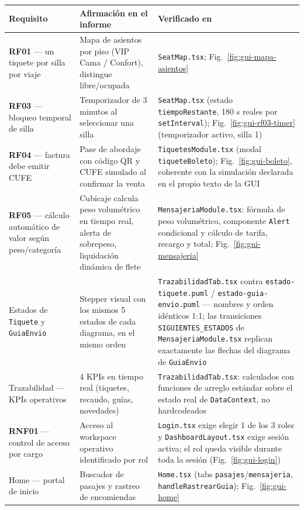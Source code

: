 \documentclass[11pt,a4paper]{article}
\begin{document}
{\small{}
\begin{longtable}{L{3.7cm} L{4.9cm} L{5.9cm}}
\toprule
{}\textbf{Requisito} & \textbf{Afirmación en el informe} & \textbf{Verificado en} \\
\midrule
\endhead
\textbf{RF01} --- un tiquete por silla por viaje & Mapa de asientos por piso (VIP Cama / Confort), distingue libre/ocupada & \texttt{SeatMap.tsx}; Fig.~\ref{fig:gui-mapa-asientos} \\
\textbf{RF03} --- bloqueo temporal de silla & Temporizador de 3 minutos al seleccionar una silla & \texttt{SeatMap.tsx} (estado \texttt{tiempoRestante}, 180 s reales por \texttt{setInterval}); Fig.~\ref{fig:gui-rf03-timer} (temporizador activo, silla 1) \\
\textbf{RF04} --- factura debe emitir CUFE & Pase de abordaje con código QR y CUFE simulado al confirmar la venta & \texttt{TiquetesModule.tsx} (modal \texttt{tiqueteBoleto}); Fig.~\ref{fig:gui-boleto}, coherente con la simulación declarada en el propio texto de la GUI \\
\textbf{RF05} --- cálculo automático de valor según peso/categoría & Cubicaje calcula peso volumétrico en tiempo real, alerta de sobrepeso, liquidación dinámica de flete & \texttt{MensajeriaModule.tsx}: fórmula de peso volumétrico, componente \texttt{Alert} condicional y cálculo de tarifa, recargo y total; Fig.~\ref{fig:gui-mensajeria} \\
Estados de \texttt{Tiquete} y \texttt{GuiaEnvio} & Stepper visual con los mismos 5 estados de cada diagrama, en el mismo orden & \texttt{TrazabilidadTab.tsx} contra \texttt{estado-tiquete.puml} / \texttt{estado-guia-envio.puml} --- nombres y orden idénticos 1:1; las transiciones \texttt{SIGUIENTES\_ESTADOS} de \texttt{MensajeriaModule.tsx} replican exactamente las flechas del diagrama de \texttt{GuiaEnvio} \\
Trazabilidad --- KPIs operativos & 4 KPIs en tiempo real (tiquetes, recaudo, guías, novedades) & \texttt{TrazabilidadTab.tsx}: calculados con funciones de arreglo estándar sobre el estado real de \texttt{DataContext}, no hardcodeados \\
\textbf{RNF01} --- control de acceso por cargo & Acceso al workspace operativo identificado por rol & \texttt{Login.tsx} exige elegir 1 de los 3 roles y \texttt{DashboardLayout.tsx} exige sesión activa; el rol queda visible durante toda la sesión (Fig.~\ref{fig:gui-login}) \\
Home --- portal de inicio & Buscador de pasajes y rastreo de encomiendas & \texttt{Home.tsx} (tabs \texttt{pasajes}/\texttt{mensajeria}, \texttt{handleRastrearGuia}); Fig.~\ref{fig:gui-home} \\
\bottomrule
\end{longtable}
}
\end{document}
